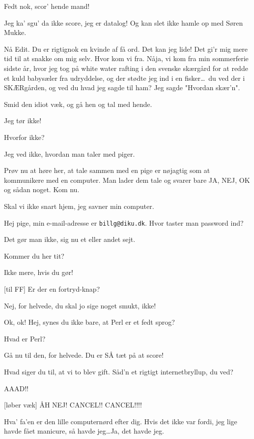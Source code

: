 \documentclass[danish]{article}
\begin{document}
\begin{sketch}
 Fedt nok, scor' hende mand!

 Jeg ka' sgu' da ikke score, jeg er datalog! Og kan slet ikke hamle op med Søren Mukke.

 Nå Edit. Du er rigtignok en kvinde af få ord. Det kan jeg
lide! Det gi'r mig mere tid til at snakke om mig selv. Hvor kom vi fra. Nåja, vi
kom fra min sommerferie sidste år, hvor jeg tog på white water rafting i den
svenske skærgård for at redde et kuld babysæler fra udryddelse, og der stødte
jeg ind i en fisker\ldots\ du ved der i SKÆRgården, og ved du hvad jeg sagde til
ham? Jeg sagde "Hvordan skær'n". 

 Smid den idiot væk, og gå hen og tal med hende.

 Jeg tør ikke!

 Hvorfor ikke?

 Jeg ved ikke, hvordan man taler med piger.

 Prøv nu at høre her, at tale sammen med en pige er nøjagtig som at
kommunikere med en computer. Man lader dem tale og svarer bare JA, NEJ, OK og
sådan noget. Kom nu. 

 Skal vi ikke snart hjem, jeg savner min computer.

 Hej pige, min e-mail-adresse er \texttt{billg@diku.dk}.
 Hvor taster man password ind?

 Det gør man ikke, sig nu et eller andet sejt.

 Kommer du her tit?

 Ikke mere, hvis du gør!

[til FF] Er der en fortryd-knap?

 Nej, for helvede, du skal jo sige noget smukt, ikke!

 Ok, ok!  Hej, synes du ikke bare, at Perl er et fedt sprog?

 Hvad er Perl?

 Gå nu til den, for helvede. Du er SÅ tæt på at score!

 Hvad siger du til, at vi to blev gift. Såd'n et rigtigt internetbryllup, du ved?

 AAAD!! 

[løber væk] ÅH NEJ! CANCEL!! CANCEL!!!!

 Hva' fa'en er den lille computernørd efter dig. Hvis det ikke var
fordi, jeg lige havde fået manicure, så havde jeg\ldots Ja, det havde jeg.


\end{sketch}
\end{document}
